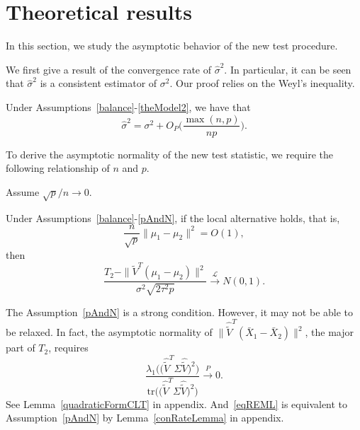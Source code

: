 
\section{Theoretical results}

In this section, we study the asymptotic behavior of the new test procedure.


 We first give a result of the convergence rate of $\hat{\sigma}^2$.
 In particular, it can be seen that $\hat{\sigma}^2$ is a consistent estimator of $\sigma^2$.   
 Our proof relies on the Weyl's inequality.
\begin{proposition}\label{varianceEstimation}
    Under Assumptions~\ref{balance}-\ref{theModel2}, we have that%
    $$
    \hat{\sigma}^2=\sigma^2 + O_P\Big(\frac{\max (n,p)}{np}\Big).
    $$
\end{proposition}

To derive the asymptotic normality of the new test statistic, we require the following relationship of $n$ and $p$.
\begin{assumption}\label{pAndN}
    Assume
    $
    {\sqrt{p}}/{n}\to 0.
    $
\end{assumption}

 


\begin{theorem}\label{myPanpan}
    Under Assumptions~\ref{balance}-\ref{pAndN},
if the local alternative holds, that is,
    $$\frac{n}{\sqrt{p}}\|\mu_1-\mu_2\|^2=O(1),$$
then 
\begin{equation*}
        \frac{T_2-\|\tilde{V}^T(\mu_1-\mu_2)\|^2}{\sigma^2\sqrt{2\tau^2 p}}\xrightarrow{\mathcal{L}}N(0,1).
\end{equation*}
\end{theorem} 
\begin{remark}
The Assumption~\ref{pAndN} is a strong condition.
However, it may not be able to be relaxed. In fact, the asymptotic normality of $\|\hat{\tilde{V}}^T(\bar{X}_1-\bar{X}_2)\|^2$, the major part of $T_2$, requires 
\begin{equation}\label{eqREML}
    \frac{\lambda_1\big(\big(\hat{\tilde{V}}^T \Sigma \hat{\tilde{V}}\big)^2\big)}{\mathrm{tr}\big(\big(\hat{\tilde{V}}^T \Sigma \hat{\tilde{V}}\big)^2\big)
}\xrightarrow{P} 0.
\end{equation}
See Lemma~\ref{quadraticFormCLT} in appendix. And~\eqref{eqREML} is equivalent to Assumption~\ref{pAndN} by Lemma~\ref{conRateLemma} in appendix.
\end{remark}




